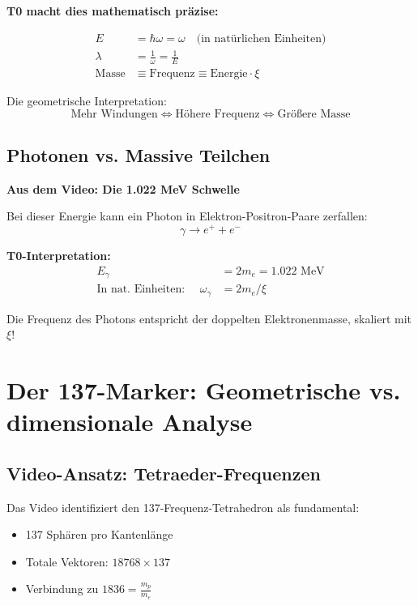 \documentclass[12pt,a4paper]{article}
\newcommand{\xipar}{\xi}
\begin{document}
	\begin{vorteil}
		\textbf{T0 macht dies mathematisch präzise:}
		
		\begin{align}
			E &= \hbar \omega = \omega \quad \text{(in natürlichen Einheiten)} \\
			\lambda &= \frac{1}{\omega} = \frac{1}{E} \\
			\text{Masse} &\equiv \text{Frequenz} \equiv \text{Energie} \cdot \xipar
		\end{align}
		
		Die geometrische Interpretation:
		\begin{equation}
			\boxed{\text{Mehr Windungen} \Leftrightarrow \text{Höhere Frequenz} \Leftrightarrow \text{Größere Masse}}
		\end{equation}
	\end{vorteil}
	
	\subsection{Photonen vs. Massive Teilchen}
	
	\textbf{Aus dem Video: Die 1.022 MeV Schwelle}
	
	Bei dieser Energie kann ein Photon in Elektron-Positron-Paare zerfallen:
	\begin{equation}
		\gamma \rightarrow e^+ + e^-
	\end{equation}
	
	\textbf{T0-Interpretation:}
	\begin{align}
		E_\gamma &= 2 m_e = 1.022 \text{ MeV} \\
		\text{In nat. Einheiten: } \quad \omega_\gamma &= 2 m_e / \xipar
	\end{align}
	
	Die Frequenz des Photons entspricht der doppelten Elektronenmasse, skaliert mit $\xipar$!
	
	\section{Der 137-Marker: Geometrische vs. dimensionale Analyse}
	
	\subsection{Video-Ansatz: Tetraeder-Frequenzen}
	
	Das Video identifiziert den 137-Frequenz-Tetrahedron als fundamental:
	\begin{itemize}
		\item 137 Sphären pro Kantenlänge
		\item Totale Vektoren: $18768 \times 137$
		\item Verbindung zu $1836 = \frac{m_p}{m_e}$
	\end{itemize}
	
\end{document}
